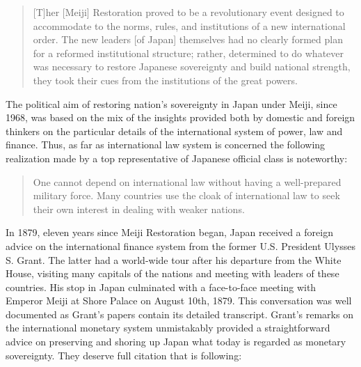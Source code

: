 \begin{quote}
[T]her [Meiji] Restoration proved to be a revolutionary event designed to accommodate to the norms, rules, and institutions of a new international order. The new leaders [of Japan] themselves had no clearly formed plan for a reformed institutional structure; rather, determined to do whatever was necessary to restore Japanese sovereignty and build national strength, they took their cues from the institutions of the great powers. \citep[p.~68]{pyle2008}
\end{quote}

The political aim of restoring nation's sovereignty in Japan under Meiji, since 1968, was based on the mix of the insights provided both by domestic and foreign thinkers on the particular details of the international system of power, law and finance. Thus, as far as international law system is concerned the following realization made by a top representative of Japanese official class is noteworthy:

\begin{quote}
One cannot depend on international law without having a well-prepared military force. Many countries use the cloak of international law to seek their own interest in dealing with weaker nations. \citep[p.~61]{schiltz2012}
\end{quote}

In 1879, eleven years since Meiji Restoration began, Japan received a foreign advice on the international finance system from the former U.S. President Ulysses S. Grant. The latter had a world-wide tour after his departure from the White House, visiting many capitals of the nations and meeting with leaders of these countries. His stop in Japan culminated with a face-to-face meeting with Emperor Meiji at Shore Palace on August 10th, 1879. This conversation was well documented as Grant's papers contain its detailed transcript. Grant's remarks on the international monetary system unmistakably provided a straightforward advice on preserving and shoring up Japan what today is regarded as monetary sovereignty. They deserve full citation that is following:


